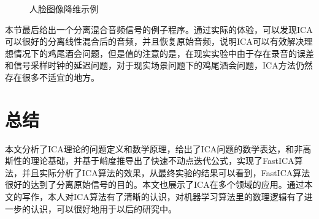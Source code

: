 \documentclass[UTF8,zihao=5,a4paper]{ctexart}
\begin{document}
\begin{figure}[h]
    \centering
    \hspace{0.2in}
    \hspace{0.2in}
    \caption{人脸图像降维示例}
    \label{fig:face}
\end{figure}


本节最后给出一个分离混合音频信号的例子程序。通过实际的体验，可以发现ICA可以很好的分离线性混合后的音频，并且恢复原始音频，说明ICA可以有效解决理想情况下的鸡尾酒会问题，但是值的注意的是，在现实实验中由于存在录音的误差和信号采样时钟的延迟问题，对于现实场景问题下的鸡尾酒会问题，ICA方法仍然存在很多不适宜的地方。

\section{总结}
本文分析了ICA理论的问题定义和数学原理，给出了ICA问题的数学表达，和非高斯性的理论基础，并基于峭度推导出了快速不动点迭代公式，实现了FastICA算法，并且实际分析了ICA算法的效果，从最终实验的结果可以看到，FastICA算法很好的达到了分离原始信号的目的。本文也展示了ICA在多个领域的应用。通过本文的写作，本人对ICA算法有了清晰的认识，对机器学习算法里的数理逻辑有了进一步的认识，可以很好地用于以后的研究中。
\end{document}
